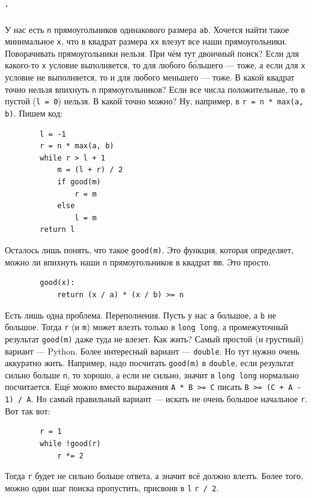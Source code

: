 \documentclass{article}
\newcommand{\pseudo}{PseudoLexer.py:PseudoLexer -x}
\newcommand{\pseudocode}[1]{\texttt{#1}}
\begin{document}
    \subparagraph{.}
    У нас есть \pseudocode{n} прямоугольников одинакового размера \pseudocode{a}\texttimes\pseudocode{b}. Хочется найти такое минимальное \pseudocode{x}, что в квадрат размера \pseudocode{x}\texttimes\pseudocode{x} влезут все наши прямоугольники. Поворачивать прямоугольники нельзя. При чём тут двоичный поиск? Если для какого-то \pseudocode{x} условие выполняется, то для любого б\'{о}льшего --- тоже, а если для \pseudocode{x} условие не выполняется, то и для любого меньшего --- тоже. В какой квадрат точно нельзя впихнуть \pseudocode{n} прямоугольников? Если все числа положительные, то в пустой (\pseudocode{l = 0}) нельзя. В какой точно можно? Ну, например, в \pseudocode{r = n * max(a, b)}. Пишем код:
    \begin{verbatim}
        l = -1
        r = n * max(a, b)
        while r > l + 1
            m = (l + r) / 2
            if good(m)
                r = m
            else
                l = m
        return l
    \end{verbatim}
    Осталось лишь понять, что такое \pseudocode{good(m)}. Это функция, которая определяет, можно ли впихнуть наши \pseudocode{n} прямоугольников в квадрат \pseudocode{m}\texttimes\pseudocode{m}. Это просто.
    \begin{verbatim}
        good(x):
            return (x / a) * (x / b) >= n
    \end{verbatim}
    Есть лишь одна проблема. Переполнения. Пусть у нас \pseudocode{a} большое, а \pseudocode{b} не большое. Тогда \pseudocode{r} (и \pseudocode{m}) может влезть только в \texttt{long long}, а промежуточный результат \pseudocode{good(m)} даже туда не влезет. Как жить?
    Самый простой (и грустный) вариант --- Python. Более интересный вариант --- \texttt{double}. Но тут нужно очень аккуратно жить. Например, надо посчитать \pseudocode{good(m)} в \texttt{double}, если результат сильно больше \pseudocode{n}, то хорошо, а если не сильно, значит в \texttt{long long} нормально посчитается. Ещё можно вместо выражения \pseudocode{A * B >= C} писать \pseudocode{B >= (C + A - 1) / A}. Но самый правильный вариант --- искать не очень большое начальное \pseudocode{r}. Вот так вот:
    \begin{verbatim}
        r = 1
        while !good(r)
            r *= 2
    \end{verbatim}
    Тогда \pseudocode{r} будет не сильно больше ответа, а значит всё должно влезть. Более того, можно один шаг поиска пропустить, присвоив в \pseudocode{l} \pseudocode{r / 2}.
\end{document}
